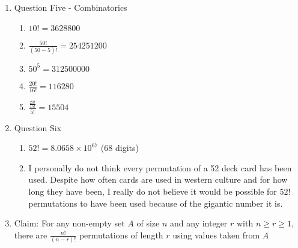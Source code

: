 \documentclass{article}
\begin{document}
\begin{enumerate}
\begin{proof}
\begin{align}
            &\hspace{1cm} \text{Since } \left (\frac{m}{2}\right )^{\frac{n}{2}} = \left (\sqrt{\frac{m}{2}}\right )^{n} \text{, we know } n! > \left (\sqrt{\frac{m}{2}}\right )^{n} \\
            &\hspace{1cm} \text{Let } m > 2a^2 \\
            &\hspace{1cm} \text{Since } m > 2a^2 \text{, we know } \frac{m}{2} > a^2 \\
            &\hspace{1cm} \text{Since } \frac{m}{2} > a^2 \text{, we know } \sqrt{\frac{m}{2}} > a \\
            &\hspace{1cm} \text{Since } \sqrt{\frac{m}{2}} > a \text{, we know } \left (\sqrt{\frac{m}{2}}\right )^n > a^n \\
            &\hspace{1cm} \text{Since } \left (\sqrt{\frac{m}{2}}\right )^n > a^n \text{, we know } n! > a^n
        \end{align}
    \end{proof}
    \item Question Five - Combinatorics
    \begin{enumerate}
        \item $10! = 3628800$
        \item $\frac{50!}{(50-5)!} = 254251200$
        \item $50^5 = 312500000$
        \item $\frac{20!}{16!} = 116280$
        \item $\frac{\frac{20!}{15!}}{5!} = 15504$
    \end{enumerate}
    \item Question Six
    \begin{enumerate}
        \item $52! = 8.0658 \times 10^{67}$ ($68$ digits)
        \item I personally do not think every permutation of a 52 deck card has been used. Despite how often cards are used in western culture and for how long they have been, I really do not believe it would be possible for $52!$ permutations to have been used because of the gigantic number it is.
    \end{enumerate}
    \item Claim: For any non-empty set $A$ of size $n$ and any integer $r$ with $n \geq r \geq 1$, there are $\frac{n!}{(n-r)!}$ permutations of length $r$ using values taken from $A$

\end{enumerate}
\end{document}
